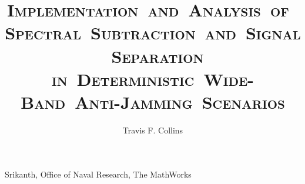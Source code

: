 \documentclass[11pt]{mvlthesis}
\title{\scshape \mbox{Implementation and Analysis of Spectral Subtraction and Signal Separation}\\
\scshape \mbox{in Deterministic Wide-Band Anti-Jamming Scenarios}}
\author{Travis F. Collins}
\begin{document}
\maketitle
\begin{abstract}



\end{abstract}


\begin{frontmatter}

\begin{acknowledgements}

Srikanth, Office of Naval Research, The MathWorks

\end{acknowledgements}
\tableofcontents
\listoffigures
\listoftables

\end{frontmatter}



%



%


%











%
%

%


\end{document}
